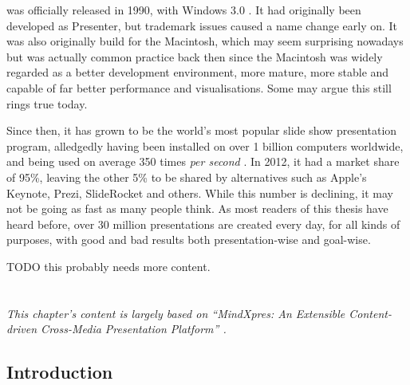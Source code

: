 \documentclass[a4paper,12pt]{report}
\begin{document}
   \ppt was officially released in 1990, with Windows 3.0 \citep{austin-1}. It
   had originally been developed as Presenter, but trademark issues caused a
   name change early on. It was also originally build for the Macintosh, which
   may seem surprising nowadays but was actually common practice back then
   since the Macintosh was widely regarded as a better development environment,
   more mature, more stable and capable of far better performance and
   visualisations. Some may argue this still rings true today.

   Since then, it has grown to be the world's most popular slide show
   presentation program, alledgedly having been installed on over 1 billion
   computers worldwide, and being used on average 350 times \emph{per second}
   \citep{parks-1}. In 2012, it had a market share of 95\%, leaving the other
   5\% to be shared by alternatives such as Apple's Keynote, Prezi, SlideRocket
   and others. While this number is declining, it may not be going as fast as
   many people think. As most readers of this thesis have heard before, over 30
   million \ppt presentations are created every day, for all kinds of purposes,
   with good and bad results both presentation-wise and goal-wise.

   TODO this probably needs more content.

  \section{\mxp}

   \emph{This chapter's content is largely based on ``MindXpres: An Extensible
   Content-driven Cross-Media Presentation Platform'' \citep{roels-1}.}

   \subsection{Introduction}

\end{document}
